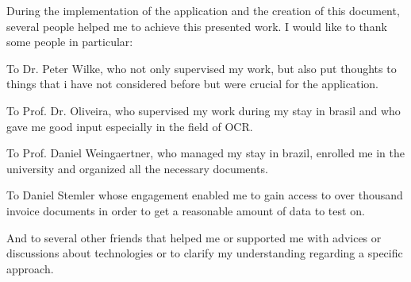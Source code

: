 During the implementation of the application and the creation of this document, several people helped me to achieve this presented work. I would like to thank some people in particular:

To Dr. Peter Wilke, who not only supervised my work, but also put thoughts to things that i have not considered before but were crucial for the application.

To Prof. Dr. Oliveira, who supervised my work during my stay in brasil and who gave me good input especially in the field of OCR.

To Prof. Daniel Weingaertner, who managed my stay in brazil, enrolled me in the university and organized all the necessary documents.

To Daniel Stemler whose engagement enabled me to gain access to over thousand invoice documents in order to get a reasonable amount of data to test on.

And to several other friends that helped me or supported me with advices or discussions about technologies or to clarify my understanding regarding a specific approach.